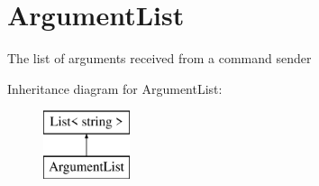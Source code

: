 \hypertarget{classOTA_1_1Command_1_1ArgumentList}{}\section{Argument\+List}
\label{classOTA_1_1Command_1_1ArgumentList}


The list of arguments received from a command sender  


Inheritance diagram for Argument\+List\+:\begin{figure}[H]
\begin{center}
\leavevmode
\includegraphics[height=2.000000cm]{classOTA_1_1Command_1_1ArgumentList}
\end{center}
\end{figure}

